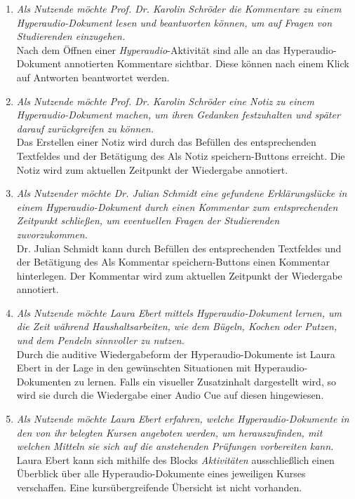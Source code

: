 \begin{enumerate}[label=US-\arabic*:,ref=US-\arabic*]
\item \label{US-Antwort-L-Eval} \textit{Als Nutzende möchte Prof. Dr. Karolin Schröder die Kommentare zu einem Hyperaudio-Dokument lesen und beantworten können, um auf Fragen von Studierenden einzugehen.}\\
Nach dem Öffnen einer \textit{Hyperaudio}-Aktivität sind alle an das Hyperaudio-Dokument annotierten Kommentare sichtbar. Diese können nach einem Klick auf \glqq Antworten\grqq{} beantwortet werden.

\item \label{US-Notiz-L-Eval} \textit{Als Nutzende möchte Prof. Dr. Karolin Schröder eine Notiz zu einem Hyperaudio-Dokument machen, um ihren Gedanken festzuhalten und später darauf zurückgreifen zu können.}\\
Das Erstellen einer Notiz wird durch das Befüllen des entsprechenden Textfeldes und der Betätigung des \glqq Als Notiz speichern\grqq{}-Buttons erreicht. Die Notiz wird zum aktuellen Zeitpunkt der Wiedergabe annotiert.

\item \label{US-Kommentar-L-Eval} \textit{Als Nutzender möchte Dr. Julian Schmidt eine gefundene Erklärungslücke in einem Hyperaudio-Dokument durch einen Kommentar zum entsprechenden Zeitpunkt schließen, um eventuellen Fragen der Studierenden zuvorzukommen.}\\
Dr. Julian Schmidt kann durch Befüllen des entsprechenden Textfeldes und der Betätigung des \glqq Als Kommentar speichern\grqq{}-Buttons einen Kommentar hinterlegen. Der Kommentar wird zum aktuellen Zeitpunkt der Wiedergabe annotiert.

\item \label{US-Zeit-Eval} \textit{Als Nutzende möchte Laura Ebert mittels Hyperaudio-Dokument lernen, um die Zeit während Haushaltsarbeiten, wie dem Bügeln, Kochen oder Putzen, und dem Pendeln sinnvoller zu nutzen.}\\
Durch die auditive Wiedergabeform der Hyperaudio-Dokumente ist Laura Ebert in der Lage in den gewünschten Situationen mit Hyperaudio-Dokumenten zu lernen. Falls ein visueller Zusatzinhalt dargestellt wird, so wird sie durch die Wiedergabe einer Audio Cue auf diesen hingewiesen.

\item \label{US-Uebersicht-Kurse-Eval} \textit{Als Nutzende möchte Laura Ebert erfahren, welche Hyperaudio-Dokumente in den von ihr belegten Kursen angeboten werden, um herauszufinden, mit welchen Mitteln sie sich auf die anstehenden Prüfungen vorbereiten kann.}\\
Laura Ebert kann sich mithilfe des Blocks \textit{Aktivitäten} ausschließlich einen Überblick über alle Hyperaudio-Dokumente eines jeweiligen Kurses verschaffen. Eine kursübergreifende Übersicht ist nicht vorhanden.


\end{enumerate}
